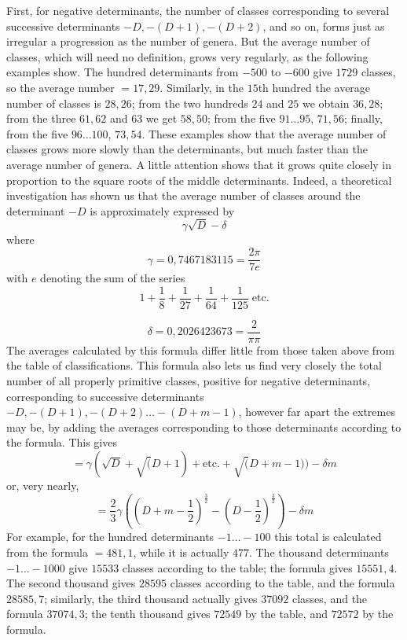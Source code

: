 First, for negative determinants, the number of classes corresponding to several successive determinants \(-D,-(D+1),-(D+2)\), and so on, forms just as irregular a progression as the number of genera. But the average number of classes, which will need no definition, grows very regularly, as the following examples show. The hundred determinants from \(-500\) to \(-600\) give \(1729\) classes, so the average number \(=17{,}29\). Similarly, in the \(15\)th hundred the average number of classes is \(28{,}26\); from the two hundreds \(24\) and \(25\) we obtain \(36{,}28\); from the three \(61,62\) and \(63\) we get \(58{,}50\); from the five \(91\ldots95\), \(71{,}56\); finally, from the five \(96\ldots100\), \(73{,}54\). These examples show that the average number of classes grows more slowly than the determinants, but much faster than the average number of genera. A little attention shows that it grows quite closely in proportion to the square roots of the middle determinants. Indeed, a theoretical investigation has shown us that the average number of classes around the determinant \(-D\) is approximately expressed by
\[\gamma\surd D-\delta\]
where
\[\gamma=0{,}7467183115=\frac{2\pi}{7e}\]
with \(e\) denoting the sum of the series
\[1+\frac18+\frac1{27}+\frac1{64}+\frac1{125}\;\text{etc.}\]

\[\delta=0{,}2026423673=\frac2{\pi\pi}\]
The averages calculated by this formula differ little from those taken above from the table of classifications. This formula also lets us find very closely the total number of all properly primitive classes, positive for negative determinants, corresponding to
successive determinants \(-D,-(D+1),-(D+2)\ldots-(D+m-1)\), however far apart the extremes may be, by adding the averages corresponding to those determinants according to the formula. This gives
\[=\gamma(\surd D+\surd(D+1)+\text{etc.}+\surd(D+m-1))-\delta m\]
or, very nearly,
\[=\frac23\gamma((D+m-\frac12)^{\frac32}-(D-\frac12)^{\frac32})-\delta m\]
For example, for the hundred determinants \(-1\ldots-100\) this total is calculated from the formula \(=481{,}1\), while it is actually \(477\). The thousand determinants \(-1\ldots-1000\) give \(15533\) classes according to the table; the formula gives \(15551{,}4\). The second thousand gives \(28595\) classes according to the table, and the formula \(28585{,}7\); similarly, the third thousand actually gives \(37092\) classes, and the formula \(37074{,}3\); the tenth thousand gives \(72549\) by the table, and \(72572\) by the formula.

